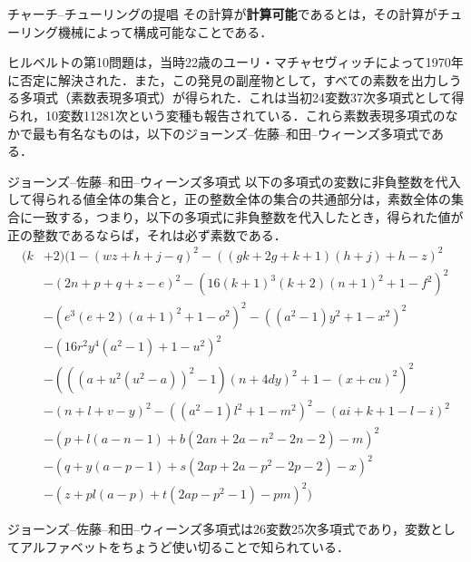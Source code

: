 \documentclass[10pt, a5paper, twoside]{ltjsarticle}
\newcommand{\hyphen}{\insertkanjiskip--\insertkanjiskip}
\begin{document}
            \begin{ths}{チャーチ\hyphen チューリングの提唱}{}
                その計算が\textbf{計算可能}であるとは，その計算がチューリング機械によって構成可能なことである．
            \end{ths}

            ヒルベルトの第10問題は，当時22歳のユーリ・マチャセヴィッチによって1970年に否定に解決された．また，この発見の副産物として，すべての素数を出力しうる多項式（素数表現多項式）が得られた．これは当初24変数37次多項式として得られ，10変数11281次という変種も報告されている．これら素数表現多項式のなかで最も有名なものは，以下のジョーンズ\hyphen 佐藤\hyphen 和田\hyphen ウィーンズ多項式である\cite{seisuutan1}．

            \begin{dfn}{ジョーンズ\hyphen 佐藤\hyphen 和田\hyphen ウィーンズ多項式}{}
                以下の多項式の変数に非負整数を代入して得られる値全体の集合と，正の整数全体の集合の共通部分は，素数全体の集合に一致する，つまり，以下の多項式に非負整数を代入したとき，得られた値が正の整数であるならば，それは必ず素数である．
                \begin{align*}
                    (k &+ 2)(1 - (wz + h + j -q)^2 - ((gk + 2g + k +1)(h + j) + h - z)^2 \\ &- (2n + p + q + z - e)^2 - (16 (k + 1)^3(k + 2)(n + 1)^2 + 1 - f^2)^2 \\ &- (e^3 (e +2)(a +1)^2 + 1 - o^2)^2 - ((a^2 - 1)y^2 + 1 - x^2)^2 \\ &- (16 r^2 y^4 (a^2 - 1) + 1 - u^2)^2 \\ &- (((a + u^2(u^2 - a))^2 - 1)(n + 4dy)^2 + 1 - (x + cu)^2)^2 \\ &- (n + l + v - y)^2 - ((a^2 - 1) l^2 + 1 - m^2)^2 - (ai +k + 1 - l - i)^2 \\ &- (p + l (a - n - 1) + b(2an + 2a - n^2 -2n -2) - m)^2 \\ &- (q + y(a - p - 1) + s(2ap + 2a - p^2 - 2p -2) -x)^2 \\ &- (z + pl(a - p) + t(2ap - p^2 -1) - pm)^2)
                \end{align*}
            \end{dfn}

            ジョーンズ\hyphen 佐藤\hyphen 和田\hyphen ウィーンズ多項式は26変数25次多項式であり，変数としてアルファベットをちょうど使い切ることで知られている．
\end{document}
